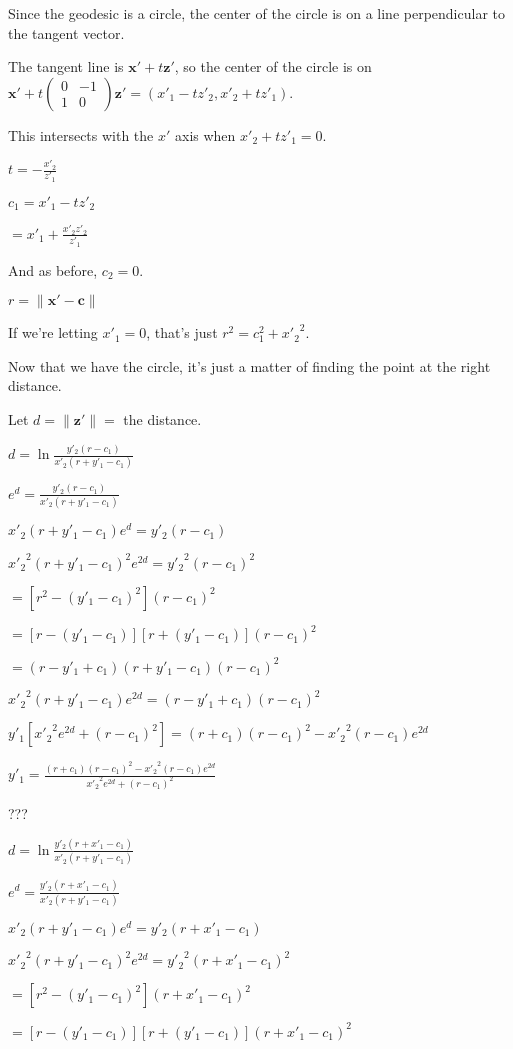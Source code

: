 \documentclass[12pt]{amsart}
\newcommand{\mat}[4]{\left(\begin{array}{ccc} #1 & #2 \\#3 & #4 \end{array} \right)}
\begin{document}
Since the geodesic is a circle, the center of the circle is on a line perpendicular to the tangent vector.

The tangent line is $\textbf{x}'+t\textbf{z}'$, so the center of the circle is on $\textbf{x}'+t\mat{0}{-1}{1}{0}\textbf{z}' = (x'_1-tz'_2,x'_2+tz'_1)$.

This intersects with the $x'$ axis when $x'_2+tz'_1 = 0$.

$t = -\frac{x'_2}{z'_1}$

$c_1 = x'_1-tz'_2$

$= x'_1+\frac{x'_2z'_2}{z'_1}$


And as before, $c_2 = 0$.

$r = \|\textbf{x}'-\textbf{c}\|$

If we're letting $x'_1 = 0$, that's just $r^2 = c_1^2+{x'_2}^2$.

Now that we have the circle, it's just a matter of finding the point at the right distance.

Let $d = \|\textbf{z}'\| =$ the distance.

$d = \ln\frac{y'_2(r-c_1)}{x'_2(r+y'_1-c_1)}$

$e^d = \frac{y'_2(r-c_1)}{x'_2(r+y'_1-c_1)}$

$x'_2(r+y'_1-c_1)e^d = y'_2(r-c_1)$

${x'_2}^2(r+y'_1-c_1)^2e^{2d} = {y'_2}^2(r-c_1)^2$

$= [r^2-(y'_1-c_1)^2](r-c_1)^2$

$= [r-(y'_1-c_1)][r+(y'_1-c_1)](r-c_1)^2$

$= (r-y'_1+c_1)(r+y'_1-c_1)(r-c_1)^2$

${x'_2}^2(r+y'_1-c_1)e^{2d} = (r-y'_1+c_1)(r-c_1)^2$

$y'_1[{x'_2}^2e^{2d}+(r-c_1)^2] = (r+c_1)(r-c_1)^2 - {x'_2}^2(r-c_1)e^{2d}$

$y'_1 = \frac{(r+c_1)(r-c_1)^2 - {x'_2}^2(r-c_1)e^{2d}}{{x'_2}^2e^{2d}+(r-c_1)^2}$

???

$d = \ln\frac{y'_2(r+x'_1-c_1)}{x'_2(r+y'_1-c_1)}$

$e^d = \frac{y'_2(r+x'_1-c_1)}{x'_2(r+y'_1-c_1)}$

$x'_2(r+y'_1-c_1)e^d = y'_2(r+x'_1-c_1)$

${x'_2}^2(r+y'_1-c_1)^2e^{2d} = {y'_2}^2(r+x'_1-c_1)^2$

$= [r^2-(y'_1-c_1)^2](r+x'_1-c_1)^2$

$= [r-(y'_1-c_1)][r+(y'_1-c_1)](r+x'_1-c_1)^2$
\end{document}
